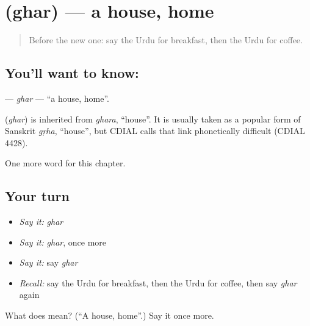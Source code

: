 \section[\texorpdfstring{\ur{گھر} (ghar)}{گھر (ghar)}]{ (ghar) — a house, home}

\label{lesson:UR-C57-ghar}



\begin{quote}
Before the new one: say the Urdu for breakfast, then the Urdu for coffee.
\end{quote}

\subsection*{You'll want to know: }
\textbf{} — \emph{ghar} — \textquotedblleft{}a house, home\textquotedblright{}.

\begin{cousinweb}
\textbf{} (\emph{ghar}) is inherited from \emph{ghara}, \textquotedblleft{}house\textquotedblright{}. It is usually taken as a popular form of Sanskrit \emph{gṛha}, \textquotedblleft{}house\textquotedblright{}, but CDIAL calls that link phonetically difficult (CDIAL 4428).
\end{cousinweb}

\begin{grammarlens}[title={What you've built}]
One more word for this chapter.
\end{grammarlens}

\subsection*{Your turn}
\begin{itemize}
\raggedright
  \item \emph{Say it:} \emph{ghar}
  \item \emph{Say it:} \emph{ghar}, once more
  \item \emph{Say it:} say \emph{ghar}
  \item \emph{Recall:} say the Urdu for breakfast, then the Urdu for coffee, then say \emph{ghar} again
\end{itemize}

\begin{tcolorbox}[breakable,colback=teal!4,colframe=teal!35!black,title={Before you move on}]
What does  mean? (\textquotedblleft{}A house, home\textquotedblright{}.) Say it once more.
\end{tcolorbox}
